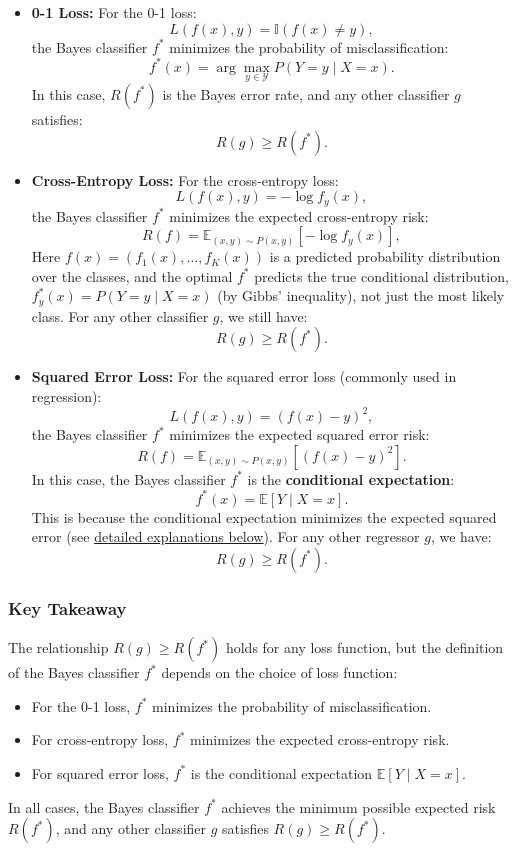 \begin{notechapter}
\begin{itemize}
    \item \textbf{0-1 Loss:}
      For the 0-1 loss:
      \[
      L(f(x), y) = \mathbb{I}(f(x) \neq y),
      \]
      the Bayes classifier \( f^* \) minimizes the probability of misclassification:
      \[
      f^*(x) = \arg\max_{y \in \mathcal{Y}} P(Y = y \mid X = x).
      \]
      In this case, \( R(f^*) \) is the Bayes error rate, and any other classifier \( g \) satisfies:
      \[
      R(g) \geq R(f^*).
      \]

    \item \textbf{Cross-Entropy Loss:}
      For the cross-entropy loss:
      \[
      L(f(x), y) = -\log f_y(x),
      \]
      the Bayes classifier \( f^* \) minimizes the expected cross-entropy risk:
      \[
      R(f) = \mathbb{E}_{(x,y) \sim P(x,y)}[-\log f_y(x)],
      \]
      Here \( f(x) = (f_1(x), \dots, f_K(x)) \) is a predicted probability distribution over the classes, and the optimal \( f^* \) predicts the true conditional distribution, \( f^*_y(x) = P(Y = y \mid X = x) \) (by Gibbs' inequality), not just the most likely class. For any other classifier \( g \), we still have:
      \[
      R(g) \geq R(f^*).
      \]

    \item \textbf{Squared Error Loss:}
      For the squared error loss (commonly used in regression):
      \[
      L(f(x), y) = (f(x) - y)^2,
      \]
      the Bayes classifier \( f^* \) minimizes the expected squared error risk:
      \[
      R(f) = \mathbb{E}_{(x,y) \sim P(x,y)}[(f(x) - y)^2].
      \]
      In this case, the Bayes classifier \( f^* \) is the \textbf{conditional expectation}:
      \[
      f^*(x) = \mathbb{E}[Y \mid X = x].
      \]
      This is because the conditional expectation minimizes the expected
      squared error
      (see \hyperref[intro-to-ml:sec:squared_error_loss]{detailed explanations below}). For any other regressor \( g \), we have:
      \[
      R(g) \geq R(f^*).
      \]
\end{itemize}

\subsubsection{Key Takeaway}
The relationship \( R(g) \geq R(f^*) \) holds for any loss function, but the definition of the Bayes classifier \( f^* \) depends on the choice of loss function:
\begin{itemize}
    \item For the 0-1 loss, \( f^* \) minimizes the probability of misclassification.
    \item For cross-entropy loss, \( f^* \) minimizes the expected cross-entropy risk.
    \item For squared error loss, \( f^* \) is the conditional expectation \( \mathbb{E}[Y \mid X = x] \).
\end{itemize}
In all cases, the Bayes classifier \( f^* \) achieves the minimum possible expected risk \( R(f^*) \), and any other classifier \( g \) satisfies \( R(g) \geq R(f^*) \).


\end{notechapter}
